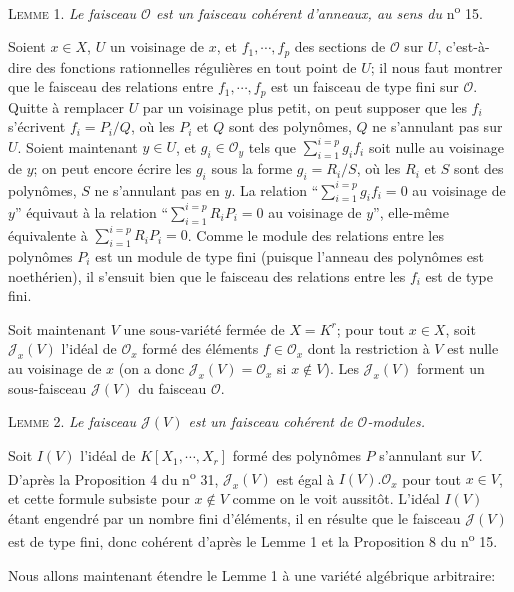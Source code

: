\textsc{Lemme} 1. \textit{Le faisceau $\mathcal{O}$ est un faisceau cohérent d'anneaux, au sens du} n\textsuperscript{o} 15.

Soient $x \in X$, $U$ un voisinage de $x$, et $f_1 , \cdots , f_p$ des sections de $\mathcal{O}$ sur $U$, c'est-à-dire des fonctions rationnelles régulières en tout point de $U$; il nous faut montrer que le faisceau des relations entre $f_1 , \cdots , f_p$ est un faisceau de type fini sur $\mathcal{O}$. Quitte à remplacer $U$ par un voisinage plus petit, on peut supposer que les $f_i$ s'écrivent $f_i = P_i/Q$, où les $P_i$ et $Q$ sont des polynômes, $Q$ ne s'annulant pas sur $U$. Soient maintenant $y \in U$, et $g_i \in \mathcal{O}_y$ tels que $\sum_{i=1}^{i=p} g_i f_i$ soit nulle au voisinage de $y$; on peut encore écrire les $g_i$ sous la forme $g_i = R_i/S$, où les $R_i$ et $S$ sont des polynômes, $S$ ne s'annulant pas en $y$. La relation ``$\sum_{i=1}^{i=p} g_i f_i = 0$ au voisinage de $y$'' équivaut à la relation ``$\sum_{i=1}^{i=p} R_i P_i = 0$ au voisinage de $y$'', elle-même équivalente à $\sum_{i=1}^{i=p} R_i P_i = 0$. Comme le module des relations entre les polynômes $P_i$ est un module de type fini (puisque l'anneau des polynômes est noethérien), il s'ensuit bien que le faisceau des relations entre les $f_i$ est de type fini.

Soit maintenant $V$ une sous-variété fermée de $X = K^r$; pour tout $x \in X$, soit $\mathcal{J}_x(V)$ l'idéal de $\mathcal{O}_x$ formé des éléments $f \in \mathcal{O}_x$ dont la restriction à $V$ est nulle au voisinage de $x$ (on a donc $\mathcal{J}_x(V) = \mathcal{O}_x$ si $x \notin V$). Les $\mathcal{J}_x(V)$ forment un sous-faisceau $\mathcal{J}(V)$ du faisceau $\mathcal{O}$.

\textsc{Lemme} 2. \textit{Le faisceau $\mathcal{J}(V)$ est un faisceau cohérent de $\mathcal{O}$-modules.}

Soit $I(V)$ l'idéal de $K[X_1, \cdots , X_r]$ formé des polynômes $P$ s'annulant sur $V$. D'après la Proposition 4 du n\textsuperscript{o} 31, $\mathcal{J}_x(V)$ est égal à $I(V).\mathcal{O}_x$ pour tout $x \in V$, et
cette formule subsiste pour $x \notin V$ comme on le voit aussitôt. L'idéal $I(V)$ étant engendré par un nombre fini d'éléments, il en résulte que le faisceau $\mathcal{J}(V)$ est de type fini, donc cohérent d'après le Lemme 1 et la Proposition 8 du n\textsuperscript{o} 15.

Nous allons maintenant étendre le Lemme 1 à une variété algébrique arbitraire:

